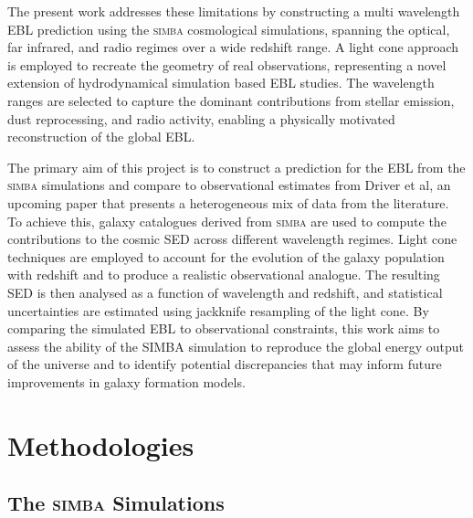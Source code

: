 \documentclass[
    a4paper, %
    10pt, %
    unnumberedsections, %
]{LTJournalArticle}
\begin{document}
The present work addresses these limitations by constructing a multi wavelength EBL prediction using the \textsc{simba} cosmological simulations, spanning the optical, far infrared, and radio regimes over a wide redshift range. A light cone approach is employed to recreate the geometry of real observations, representing a novel extension of hydrodynamical simulation based EBL studies. The wavelength ranges are selected to capture the dominant contributions from stellar emission, dust reprocessing, and radio activity, enabling a physically motivated reconstruction of the global EBL.

The primary aim of this project is to construct a prediction for the EBL from the \textsc{simba} simulations and compare to observational estimates from Driver et al, an upcoming paper that presents a heterogeneous mix of data from the literature. To achieve this, galaxy catalogues derived from \textsc{simba} are used to compute the contributions to the cosmic SED across different wavelength regimes. Light cone techniques are employed to account for the evolution of the galaxy population with redshift and to produce a realistic observational analogue. The resulting SED is then analysed as a function of wavelength and redshift, and statistical uncertainties are estimated using jackknife resampling of the light cone. By comparing the simulated EBL to observational constraints, this work aims to assess the ability of the SIMBA simulation to reproduce the global energy output of the universe and to identify potential discrepancies that may inform future improvements in galaxy formation models.

\section{Methodologies}

\subsection{The \textsc{\textmd{simba}} Simulations}
\end{document}
